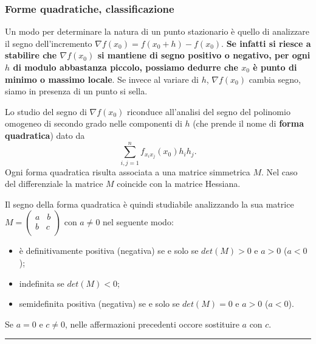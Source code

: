 \subsubsection*{Forme quadratiche, classificazione}
Un modo per determinare la natura di un punto stazionario è quello di analizzare il segno dell'incremento $\nabla f(x_0) = f(x_0 + h ) - f(x_0)$. \textbf{Se infatti si riesce a stabilire che $\nabla f(x_0)$ si mantiene di segno positivo o negativo, per ogni $h$ di modulo abbastanza piccolo, possiamo dedurre che $x_0$ è punto di minimo o massimo locale}. Se invece al variare di $h$, $\nabla f(x_0)$ cambia segno, siamo in presenza di un punto si sella.\newline
\begin{tcolorbox}
Lo studio del segno di $\nabla f(x_0)$ riconduce all'analisi del segno del polinomio omogeneo di secondo grado nelle componenti di $h$ (che prende il nome di \textbf{forma quadratica}) dato da
\[
    \sum_{i,j=1}^{n}f_{x_ix_j}(x_0)h_ih_j.
\]
Ogni forma quadratica risulta associata a una matrice simmetrica $M$. Nel caso del differenziale la matrice $M$ coincide con la matrice Hessiana.
\end{tcolorbox}
\begin{tcolorbox}
Il segno della forma quadratica è quindi studiabile analizzando la sua matrice $M = \left(\begin{matrix}
    a \;\;\; b\\
    b \;\;\; c\\
\end{matrix} \right)$ con $a\neq 0$ nel seguente modo:
\begin{itemize}
    \item è definitivamente positiva (negativa) se e solo se $det(M)>0$ e $a >0$ ($a<0$);
    \item indefinita se $det(M)<0$;
    \item semidefinita positiva (negativa) se e solo se $det(M)=0$ e $a>0$ ($a<0$).
\end{itemize}
Se $a = 0$ e $c\neq 0$, nelle affermazioni precedenti occore sostituire $a$ con $c$.
\end{tcolorbox}
\rule{\textwidth}{0.4pt}

